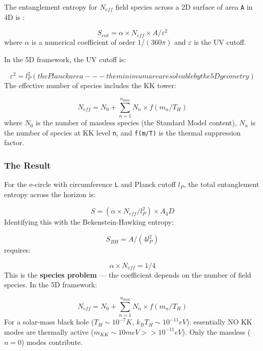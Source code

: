\documentclass[aps,prd,preprint,superscriptaddress,longbibliography,floatfix]{revtex4-2}
\theoremstyle{remark}
\begin{document}
The entanglement entropy for $N_{eff}$ field species across a 2D surface of area \texttt{A} in 4D is \cite{Srednicki1993}:


\begin{equation}
    S_{ent} = \alpha \times N_{eff} \times A / \varepsilon^{2}
\end{equation}
where $\alpha$ is a numerical coefficient of order $1/(360\pi)$ and $\varepsilon$ is the UV cutoff.

In the 5D framework, the UV cutoff is:


\begin{equation}
    \varepsilon^{2} = l_P^{2} (the Planck area --- the minimum area resolvable by the 5D geometry)
\end{equation}
The effective number of species includes the KK tower:


\begin{equation}
    N_{eff} = N_0 + \sum_{n=1}^{n_{\max}} N_n \times f(m_n/T_H)
\end{equation}
where $N_0$ is the number of massless species (the Standard Model content), $N_n$ is the number of species at KK level \texttt{n}, and \texttt{f(m/T)} is the thermal suppression factor.


\subsubsection{The Result}

For the e-circle with circumference \texttt{L} and Planck cutoff $l_P$, the total entanglement entropy across the horizon is:


\begin{equation}
    S = (\alpha \times N_{eff} / l_P^{2}) \times A_{4}D
\end{equation}
Identifying this with the Bekenstein-Hawking entropy:


\begin{equation}
    S_{BH} = A/(4l_P^{2})
\end{equation}
requires:


\begin{equation}
    \alpha \times N_{eff} = 1/4
\end{equation}
This is the \textbf{species problem} --- the coefficient depends on the number of field species. In the 5D framework:


\begin{equation}
    N_{eff} = N_{0} + \sum_{n=1}^{n_{\max}} N_n \times f(m_n/T_H)
\end{equation}
For a solar-mass black hole ($T_H \sim  10^{-7} K$, $k_B T_H \sim  10^{-11} eV$): essentially NO KK modes are thermally active ($m_{KK} \sim  10 meV >> 10^{-11} eV$). Only the massless ($n = 0$) modes contribute.
\end{document}
